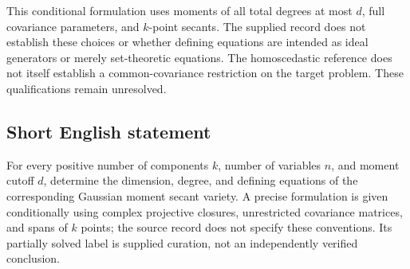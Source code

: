 \documentclass[11pt]{article}
\begin{document}
This conditional formulation uses moments of all total degrees at most \(d\), full covariance parameters, and \(k\)-point secants. The supplied record does not establish these choices or whether defining equations are intended as ideal generators or merely set-theoretic equations. The homoscedastic reference does not itself establish a common-covariance restriction on the target problem. These qualifications remain unresolved.
\subsection{Short English statement}
For every positive number of components \(k\), number of variables \(n\), and moment cutoff \(d\), determine the dimension, degree, and defining equations of the corresponding Gaussian moment secant variety. A precise formulation is given conditionally using complex projective closures, unrestricted covariance matrices, and spans of \(k\) points; the source record does not specify these conventions. Its partially solved label is supplied curation, not an independently verified conclusion.
\end{document}
